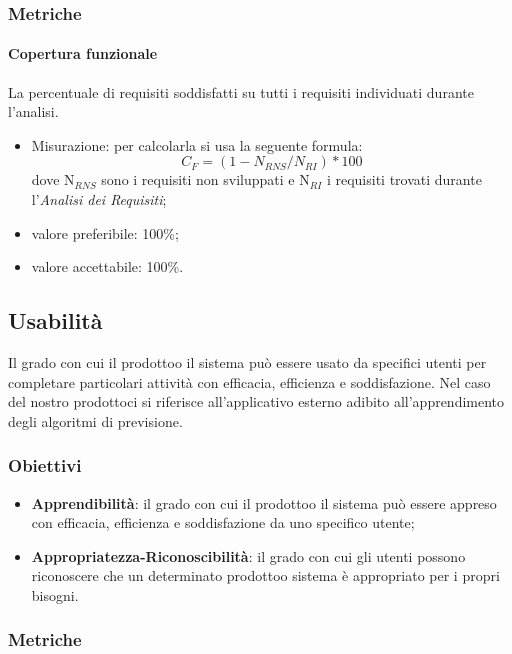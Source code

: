         \subsubsection{Metriche}
            \paragraph{Copertura funzionale}
                La percentuale di requisiti soddisfatti su tutti i requisiti individuati durante l'analisi.
                \begin{itemize}
                    \item Misurazione: per calcolarla si usa la seguente formula: 
                    \[C_F=(1-N_{RNS}/N_{RI})*100\]
                    dove N$_{RNS}$ sono i requisiti non sviluppati e N$_{RI}$ i requisiti trovati durante l'\textit{Analisi dei Requisiti};
                    \item valore preferibile: 100\%;
                    \item valore accettabile: 100\%.
                \end{itemize}
    \subsection{Usabilità}
        Il grado con cui il prodotto\glosp o il sistema può essere usato da specifici utenti per completare particolari attività con efficacia, efficienza e soddisfazione. Nel caso del nostro prodotto\glosp ci si riferisce all'applicativo esterno adibito all'apprendimento degli algoritmi di previsione.
        \subsubsection{Obiettivi}
            \begin{itemize}
                \item \textbf{Apprendibilità}: il grado con cui il prodotto\glosp o il sistema può essere appreso con efficacia, efficienza e soddisfazione da uno specifico utente;
                \item \textbf{Appropriatezza-Riconoscibilità}: il grado con cui gli utenti possono riconoscere che un determinato prodotto\glosp o sistema è appropriato per i propri bisogni.
            \end{itemize}
        \subsubsection{Metriche}
